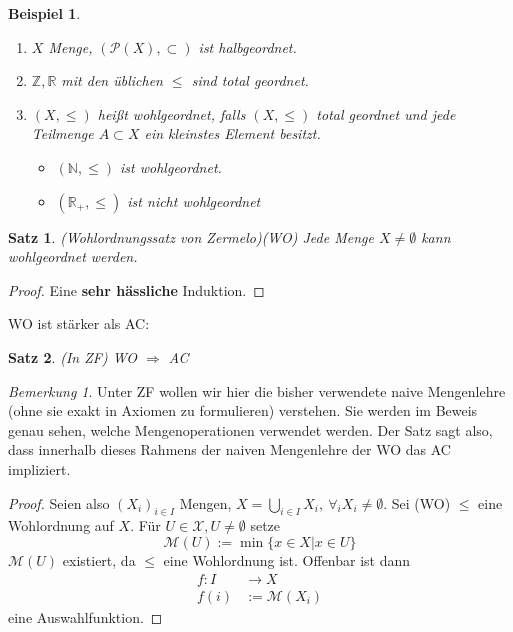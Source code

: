 \documentclass[12pt,a4paper]{article}
\newtheorem{theorem}{Satz}
\newtheorem*{example}{Beispiel}
\theoremstyle{definition}
\theoremstyle{remark}
\newtheorem*{remark}{Bemerkung}
\begin{document}
		\begin{example}
			\begin{enumerate}
				\item
					$X$ Menge, $(\mathcal{P}(X), \subset)$ ist halbgeordnet.
				\item
					$\mathbb{Z}, \mathbb{R}$ mit den üblichen $\leq$ sind total geordnet. 
				\item 
					$(X, \leq)$ heißt wohlgeordnet, falls $(X, \leq)$ total geordnet und jede Teilmenge $A \subset X$ ein kleinstes Element besitzt.
					\begin{itemize}
						\item
							$(\mathbb{N}, \leq)$ ist wohlgeordnet.
						\item
							$(\mathbb{R}_+, \leq)$ ist nicht wohlgeordnet
					\end{itemize}
			\end{enumerate}
		\end{example}
		\begin{theorem}{(Wohlordnungssatz von Zermelo)(WO)}
			Jede Menge $X \neq \emptyset$ kann wohlgeordnet werden.
		\end{theorem}
		\begin{proof}
			Eine \textbf{sehr hässliche} Induktion.
		\end{proof}
		WO ist stärker als AC:
		\begin{theorem}{(In ZF)}
			WO $\Rightarrow$ AC
		\end{theorem}
		\begin{remark}
			Unter ZF wollen wir hier die bisher verwendete naive Mengenlehre (ohne sie exakt in Axiomen zu formulieren) verstehen. Sie werden im Beweis genau sehen, welche Mengenoperationen verwendet werden. Der Satz sagt also, dass innerhalb dieses Rahmens der naiven Mengenlehre der WO das AC impliziert.
		\end{remark}
		\begin{proof}
			Seien also $(X_i)_{i \in I}$ Mengen, $X= \bigcup_{i \in I} X_i, \ \forall_{i} X_i \neq \emptyset$. Sei (WO) $\leq$ eine Wohlordnung auf $X$. Für $U \in \mathcal{X}, U \neq \emptyset$ setze
			\begin{equation}
				\mathcal{M}(U) := \min \{ x \in X | x \in U \}
			\end{equation}
			$\mathcal{M}(U)$ existiert, da $\leq$ eine Wohlordnung ist. Offenbar ist dann
			\begin{equation}
				\begin{split}
					f: I &\rightarrow X \\
					f(i) &:= \mathcal{M}(X_i)
				\end{split}
			\end{equation}
			eine Auswahlfunktion.
		\end{proof}
\end{document}
